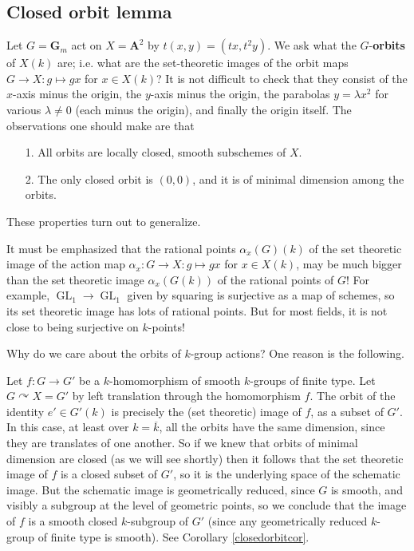 \documentclass[10pt]{article}
\renewcommand{\AA}{\mathbf{A}}
\newcommand{\GL}{\operatorname{GL}}
\renewcommand{\(}{\left(}
\renewcommand{\)}{\right)}
\renewcommand{\bar}{\overline}
\newcommand{\actson}{\curvearrowright}
\numberwithin{thm}{subsection}
\begin{document}
\subsection{Closed orbit lemma} 
\begin{ex}
Let $G=\mathbf{G}_m$ act on $X=\AA^2$
by $t(x,y)=(tx, t^2y)$.
We ask what the $G$-\textbf{orbits}
of $X(k)$ are;
i.e. what are the set-theoretic images
of the orbit maps $G\to X:g\mapsto gx$ for $x\in X(k)$?
It is not difficult to check that they consist of the $x$-axis
minus the origin,
the $y$-axis minus the origin,
the parabolas $y=\lambda x^2$ for various $\lambda\neq 0$
(each minus the origin),
and finally the origin itself.
The observations one should make are that
\begin{itemize}
\item[1. ] All orbits are locally closed, smooth subschemes of $X$.
\item[2. ] The only closed orbit is $(0,0)$, and it is of minimal dimension
among the orbits.
\end{itemize}
These properties turn out to generalize.
\end{ex}
\begin{rem}It must be emphasized
that the rational points $\alpha_x(G)(k)$
of the set theoretic image
of the action map $\alpha_x:G\to X:g\mapsto gx$
for $x\in X(k)$,
may be much bigger than the set theoretic image
$\alpha_x(G(k))$
of the rational points of  $G$!
For example, $\GL_1\to \GL_1$ given by squaring
is surjective as a map of schemes,
so its set theoretic image has lots of rational points.
But for most fields,
it is not close to being surjective on $k$-points!
\end{rem}
Why do we care about the orbits of $k$-group actions? One reason is the following.
\begin{ex}
Let $f:G\to G'$ be a $k$-homomorphism of smooth $k$-groups of finite type.
Let $G\actson X= G'$ by left translation through the homomorphism $f$.
The orbit of the identity $e'\in G'(k)$
is precisely the (set theoretic) image of $f$,
as a subset of $G'$.
In this case, at least over $k=\bar k$,
all the orbits have the same dimension,
since they are translates of one another.
So if we knew that orbits of minimal dimension
are closed (as we will see shortly)
then it follows that the set theoretic image of $f$
is a closed subset of $G'$, so it is the underlying
space of the schematic image.  But the schematic image is
geometrically reduced, since $G$ is smooth, and visibly
a subgroup at the level of geometric points, so we conclude that the image of $f$ is 
a smooth closed $k$-subgroup of $G'$ (since any geometrically
reduced $k$-group of finite type is smooth).  See Corollary \ref{closedorbitcor}.
\end{ex}
\end{document}
